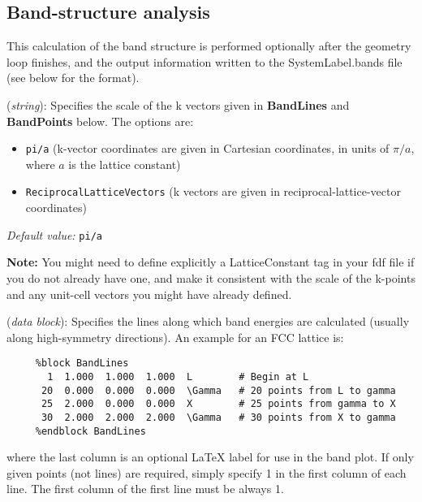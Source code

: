 \documentclass[11pt]{article}
\begin{document}
\subsection{Band-structure analysis}
\label{sec:band-structure}

This calculation of the band structure is performed optionally after
the geometry loop finishes, and the output information written
to the SystemLabel.bands file (see below for the format).

\begin{description}
\itemsep 10pt
\parsep 0pt

\item[{\bf BandLinesScale}] ({\it string}):
Specifies the scale of the k vectors given in {\bf BandLines}
and {\bf BandPoints} below.
The options are:
\begin{itemize}
\item {\tt pi/a} (k-vector coordinates are given in Cartesian
coordinates, in units of $\pi/a$, where $a$ is the lattice constant)
\item {\tt ReciprocalLatticeVectors} (k vectors are given in
reciprocal-lattice-vector coordinates)
\end{itemize}

{\it Default value:} {\tt pi/a}

{\bf Note:} You might need to define explicitly a LatticeConstant tag
in your fdf file if you do not already have one, and make it
consistent
with the scale of the k-points and any unit-cell vectors you might
have already defined.

\item[{\bf BandLines}] ({\it data block}):
Specifies the lines along which band energies are calculated
(usually along high-symmetry directions).
An example for an FCC lattice is:

\begin{verbatim}
     %block BandLines
       1  1.000  1.000  1.000  L        # Begin at L
      20  0.000  0.000  0.000  \Gamma   # 20 points from L to gamma
      25  2.000  0.000  0.000  X        # 25 points from gamma to X
      30  2.000  2.000  2.000  \Gamma   # 30 points from X to gamma
     %endblock BandLines
\end{verbatim}

where the last column is an optional LaTeX label for use in the band plot.
If only given points (not lines) are required, simply specify 1 in the
first column of each line. The first column of the first line must be
always 1.


\end{description}
\end{document}
